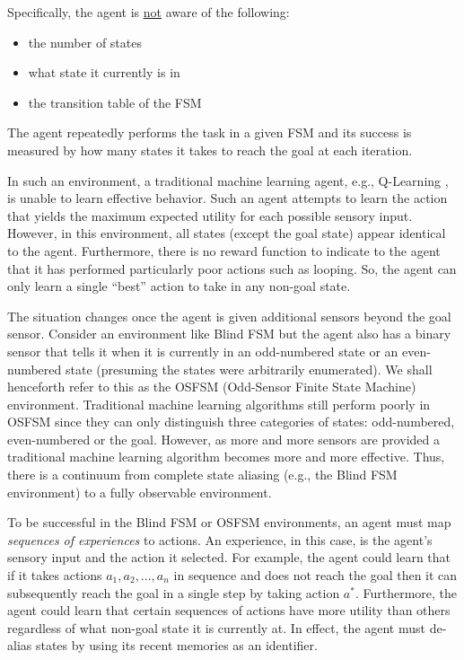 \documentclass[letterpaper]{article} %
\begin{document}
\bigskip  %

Specifically, the agent is \underline{not} aware of the following:
\begin{itemize}
\item the number of states
\item what state it currently is in
\item the transition table of the FSM
\end{itemize}

\noindent The agent repeatedly performs the task in a given FSM and its success
is measured by how many states it takes to reach the goal at each
iteration.  

In such an environment, a traditional machine learning agent, e.g.,
Q-Learning \cite{Sutton98}, is unable to learn effective behavior.
Such an agent attempts to learn the action that yields the maximum
expected utility for each possible sensory input.  However, in this
environment, all states (except the goal state) appear identical to
the agent. Furthermore, there is no reward function to indicate to the
agent that it has performed particularly poor actions such as
looping. So, the agent can only learn a single ``best'' action to take
in any non-goal state.

The situation changes once the agent is given additional sensors
beyond the goal sensor.  Consider an environment like Blind FSM but
the agent also has a binary sensor that tells it when it is currently
in an odd-numbered state or an even-numbered state (presuming the
states were arbitrarily enumerated).  We shall henceforth refer to
this as the OSFSM (Odd-Sensor Finite State Machine)
environment. Traditional machine learning algorithms still perform
poorly in OSFSM since they can only distinguish three categories
of states: odd-numbered, even-numbered or the goal.  However, as more and
more sensors are provided a traditional machine learning algorithm
becomes more and more effective.  Thus, there is a continuum from
complete state aliasing (e.g., the Blind FSM environment) to a fully
observable environment.

To be successful in the Blind FSM or OSFSM environments, an agent must map
\textit{sequences of experiences} to actions. An experience, in this case,
is the agent's sensory input and the action it selected.  For
example, the agent could learn that if it takes actions $a_1, a_2, ..., a_n$ in
sequence and does not reach the goal then it can subsequently reach the goal in
a single step by taking action $a^*$.  Furthermore, the agent could learn that
certain sequences of actions have more utility than others regardless of what
non-goal state it is currently at. In effect, the agent must de-alias states by
using its recent memories as an identifier.
\end{document}
